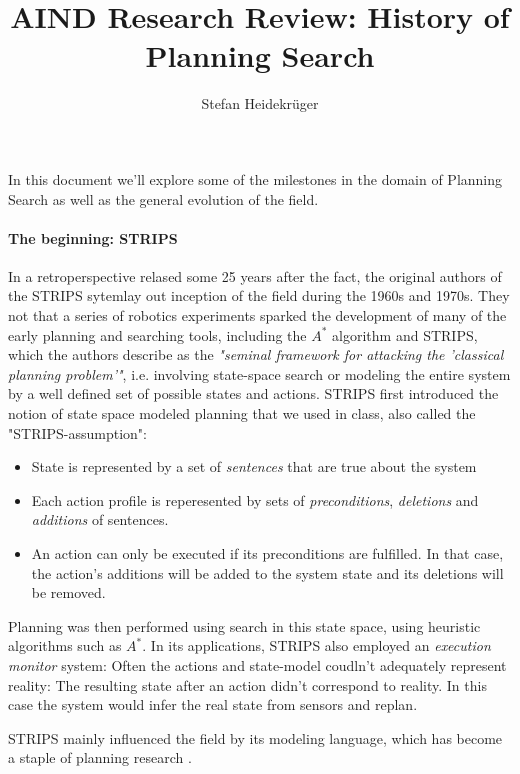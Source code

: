 \documentclass{article}
\title{AIND Research Review: History of Planning Search}
\author{Stefan Heidekrüger}
\theoremstyle{plain}
\theoremstyle{definition}
\theoremstyle{remark}
\begin{document}
\maketitle

In this document we'll explore some of the milestones in the domain of Planning Search as well as the general evolution of the field. 

\paragraph{The beginning: STRIPS}
In a retroperspective relased some 25 years after the fact, \cite{fikes1993strips}\textemdash the original authors of the STRIPS sytem\textemdash lay out inception of the field during the 1960s and 1970s. They not that a series of robotics experiments sparked the development of many of the early planning and searching tools, including the $A^*$ algorithm and STRIPS, which the authors describe as the \emph{"seminal framework for attacking
the 'classical planning problem'"}, i.e. involving state-space search or modeling the entire system by a well defined set of possible states and actions.
STRIPS first introduced the notion of state space modeled planning that we used in class, also called the "STRIPS-assumption":
\begin{itemize}
	\item State is represented by a set of \emph{sentences} that are true about the system
	\item Each action profile is reperesented by sets of \emph{preconditions}, \emph{deletions} and \emph{additions} of sentences.
	\item An action can only be executed if its preconditions are fulfilled. In that case, the action's additions will be added to the system state and its deletions will be removed.
\end{itemize}

Planning was then performed using search in this state space, using heuristic algorithms such as $A^*$. In its applications, STRIPS also employed an \emph{execution monitor} system: Often the actions and state-model coudln't adequately represent reality: The resulting state after an action didn't correspond to reality. In this case the system would infer the real state from sensors and replan.

STRIPS mainly influenced the field by its modeling language, which has become a staple of planning research \citep[Chapter 10.6]{russell2009artificial}.
\end{document}
